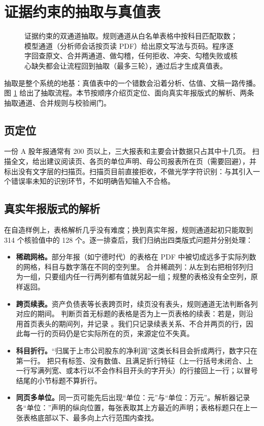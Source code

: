 \section{证据约束的抽取与真值表}
\label{sec:extraction}

\begin{figure}[t]
  \centering
  \caption{证据约束的双通道抽取。规则通道从白名单表格中按科目匹配取数；模型通道（分析师会话按页读 PDF）给出原文写法与页码。程序逐字回查原文、合并两通道、做勾稽，任何拒收、冲突、勾稽失败或核心缺失都会让流程回到抽取（最多三轮），通过后才生成真值表。}
  \label{fig:extraction}
\end{figure}

抽取是整个系统的地基：真值表中的一个错数会沿着分析、估值、文稿一路传播。图 \ref{fig:extraction} 给出了抽取流程。本节按顺序介绍页定位、面向真实年报版式的解析、两条抽取通道、合并规则与校验闸门。

\subsection{页定位}
一份 A 股年报通常有 200 页以上，三大报表和主要会计数据只占其中十几页。 扫描全文，给出建议阅读页、各页的单位声明、母公司报表所在页（需要回避），并标出没有文字层的扫描页。扫描页目前直接拒收，不做光学字符识别：与其引入一个错误率未知的识别环节，不如明确告知输入不合格。

\subsection{真实年报版式的解析}
\label{sec:parsing}
在自造样例上，表格解析几乎没有难度；换到真实年报，规则通道起初只能取到 314 个核验值中的 128 个。逐一排查后，我们归纳出四类版式问题并分别处理：

\begin{itemize}
  \item \textbf{稀疏网格。}部分年报（如宁德时代）的表格在 PDF 中被切成远多于实际列数的网格，科目与数字落在不同的空列里。 合并稀疏列：从左到右把相邻列归为一组，只要组内任一行两列都有值就另起一组；规整的表格没有全空列，原样返回。
  \item \textbf{跨页续表。}资产负债表等长表跨页时，续页没有表头，规则通道无法判断各列对应的期间。 判断页首无标题的表格是否为上一页表格的续表：若是，则沿用首页表头的期间列，并记录 。我们只记录续表关系、不合并两页的行，因此每一行的页码仍是它实际所在的页，来源定位不失真。
  \item \textbf{科目折行。}“归属于上市公司股东的净利润”这类长科目会折成两行，数字只在第一行。 把只有标签、没有数值、且满足折行特征（上一行括号未闭合、上一行写满列宽、或本行以不会作科目开头的字开头）的行接回上一行；以冒号结尾的小节标题不算折行。
  \item \textbf{同页多单位。}同一页可能先后出现“单位：元”与“单位：万元”。解析器记录各“单位：”声明的纵向位置，每张表取其上方最近的声明；表格标题只在上一张表格底部以下、最多向上六行范围内查找。
\end{itemize}

